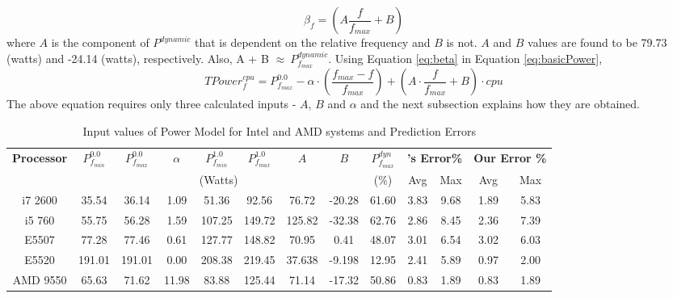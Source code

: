 \documentclass{sig-alternate}
\begin{document}
\begin{equation}
\label{eq:beta}
 \beta_f  = (A \frac{f}{f_{max}} + B)  
\end{equation}
where $A$ is the component of $P^{dynamic}$ that is dependent on the relative frequency and $B$ is not. $A$ and $B$ values are found to be 79.73 (watts) and -24.14 (watts), respectively. Also, A + B $\approx \ P^{dynamic}_{f_{max}}$. Using Equation \ref{eq:beta} in Equation \ref{eq:basicPower}, 
\begin{equation}
\label{eq:powerEq}
TPower^{cpu}_{f} = P^{0.0}_{f_{max}} - \alpha \cdot (\frac{f_{max} - f}{f_{max}}) + (A \cdot \frac{f}{f_{max}} + B)\cdot cpu
\end{equation}
The above equation requires only three calculated inputs - $A$, $B$ and $\alpha$ and the next subsection explains how they are obtained.  
\begin{table*}[t]	
\caption{Input values of Power Model for Intel and AMD systems and Prediction Errors}
\begin{center}
\begin{tabular}{|c|c|c|c|c|c|c|c|c||c|c||c|c|}\hline
\textbf{Processor} 	& 	$P^{0.0}_{f_{min}}$  	&	$P^{0.0}_{f_{max}}$ 	&	$\alpha$ 	&	$P^{1.0}_{f_{min}}$ 	&	$P^{1.0}_{f_{max}}$ 	&	$A$	&	$B$	&	$P^{dyn}_{f_{max}}$ 	&	\multicolumn{2}{c||}{\textbf{\cite{Petrucci2011}'s Error\%}} 	&	\multicolumn{2}{c|}{\textbf{Our Error \%}} 	\\ 	\cline{2-13} 			
	&	\multicolumn{7}{c|}{(Watts)} 													&	($\%$) 	&	Avg 	&	Max 	&	Avg 	&	Max 	\\ \hline
 i7 2600	&	35.54	&	36.14	&	1.09	&	51.36	&	92.56	&	76.72	&	-20.28	&	61.60	&	3.83	&	9.68	&	1.89	&	5.83	\\ \hline
i5 760	&	55.75	&	56.28	&	1.59	&	107.25	&	149.72	&	125.82	&	-32.38	&	62.76	&	2.86	&	8.45	&	2.36	&	7.39	\\ \hline
 E5507	&	77.28	&	77.46	&	0.61	&	127.77	&	148.82	&	70.95	&	0.41	&	48.07	&	3.01	&	6.54	&	3.02	&	6.03	\\ \hline
 E5520	&	191.01	&	191.01	&	0.00	&	208.38	&	219.45	&	37.638	&	-9.198	&	12.95	&	2.41	&	5.89	&	0.97	&	2.00	\\ \hline
AMD 9550	&	65.63	&	71.62	&	11.98	&	83.88	&	125.44	&	71.14	&	-17.32	&	50.86	&	0.83	&	1.89	&	0.83	&	1.89	\\ \hline






\end{tabular}
\label{powerInput}
\end{center}
 \vspace{-0.5cm}
\end{table*}
\end{document}
